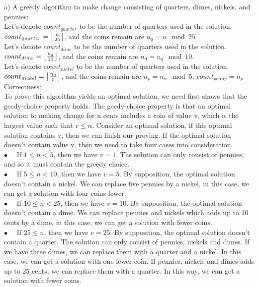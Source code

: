 \documentclass[12pt,letterpaper]{article}
\DeclarePairedDelimiter\floor{\lfloor}{\rfloor}
\begin{document}
a) A greedy algorithm to make change consisting of quarters, dimes, nickels, and pennies: \\
Let's denote $count_{quarter}$ to be the number of quarters used in the solution. $count_{quarter} =  \floor[\big]{\frac{n}{25}}$, and the coins remain are $n_q = n \mod 25$. \\
Let's denote $count_{dime}$ to be the number of quarters used in the solution. $count_{dime} =  \floor[\big]{\frac{n_q}{10}}$, and the coins remain are $n_d = n_q \mod 10$. \\
Let's denote $count_{nickel}$ to be the number of quarters used in the solution. $count_{nickel} =  \floor[\big]{\frac{n_d}{5}}$, and the coins remain are $n_p = n_n \mod 5$. $count_{penny} = n_p$ \\
Correctness: \\
To prove this algorithm yields an optimal solution, we need first shows that the geedy-choice property holds. The geedy-choice property is that an optimal solution to making change for n cents includes a coin of value v, which is the largest value such that $v \le n$. Consider an optimal solution, if this optimal solution contains v, then we can finish our proving. If the optimal solution doesn't contain value v, then we need to take four cases into consideration. \\
$\bullet \quad$ If $1 \le n < 5$, then we have $ v = 1 $. Ths solution can only consist of pennies, and so it must contain the greedy choice. \\ 
$\bullet \quad$ If $5 \le n < 10$, then we have $ v = 5 $. By supposition, the optimal solution doesn't contain a nickel. We can replace five pennies by a nickel, in this case, we can get a solution with four coins fewer. \\
$\bullet \quad$ If $10 \le n < 25$, then we have $ v = 10 $. By supposition, the optimal solution doesn't contain a dime. We can replace pennies and nickels which adds up to 10 cents by a dime, in this case, we can get a solution with fewer coins. \\
$\bullet \quad$ If $25 \le n $, then we have $ v = 25 $. By supposition, the optimal solution doesn't contain a quarter. The solution can only consist of pennies, nickels and dimes. If we have three dimes, we can replace them with a quarter and a nickel. In this case, we can get a solution with one fewer coin. If pennies, nickels and dimes adds up to 25 cents, we can replace them with a quarter. In this way, we can get a solution with fewer coins. \\
\end{document}
